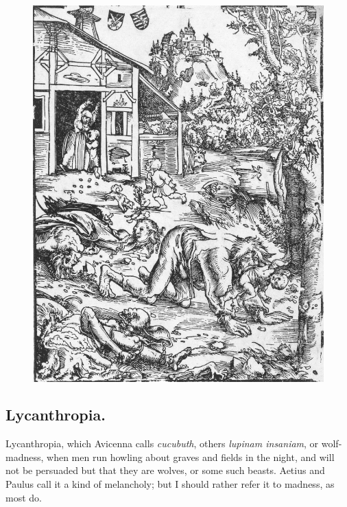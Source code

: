 {\cleartoleftpage{}
\begin{figure}[p]
  \begingroup
  \centering
  \includegraphics[keepaspectratio,width=\textwidth]{figures/Werewolf-with-bodies-small.jpg}
  \label{fig:werewolf}
\end{figure}

\clearpage{}
\subsection{Lycanthropia.}
Lycanthropia, which Avicenna calls \emph{cucubuth}, others
\emph{lupinam insaniam}, or wolf-madness, when men run howling about graves
and fields in the night, and will not be persuaded but that they are
wolves, or some such beasts. Aetius and Paulus call it a kind
of melancholy; but I should rather refer it to madness, as most do.

}
